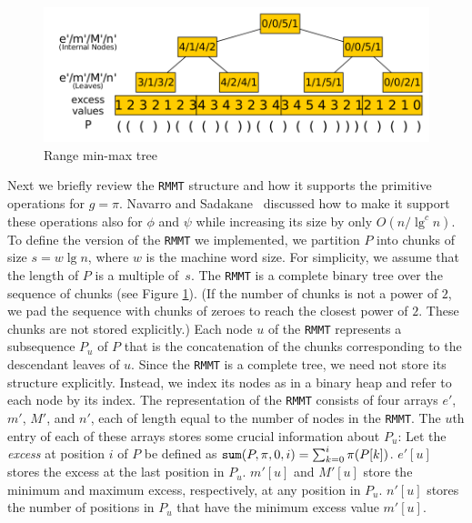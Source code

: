 \begin{figure}[t]
  \centerline{\includegraphics[scale=0.28]{./images/Range-min-max-tree.png}}
  \vspace{1ex}
  \caption{Range min-max tree}
  \label{fig:RangeMinMaxTree}
\end{figure}

Next we briefly review the {\tt RMMT} structure and how it supports
the primitive operations for $g = \pi$.  Navarro and
Sadakane~\cite{Navarro:2014:FFS:2620785.2601073} discussed how to make
it support these operations also for $\phi$ and $\psi$ while
increasing its size by only $O(n/\lg^c n)$.  To define the version of
the {\tt RMMT} we implemented, we partition $P$ into chunks
of size $s = w \lg n$, where $w$ is the machine word size.  For
simplicity, we assume that the length of $P$ is a multiple of~$s$.
The {\tt RMMT} is a complete binary tree over the sequence of
chunks (see Figure \ref{fig:RangeMinMaxTree}).
(If the number of chunks is not a power of $2$, we pad the sequence
with chunks of zeroes to reach the closest power of $2$.
These chunks are not stored explicitly.)
Each node $u$ of the {\tt RMMT} represents a subsequence $P_u$
of $P$ that is the concatenation of the chunks corresponding to the
descendant leaves of $u$.  Since the {\tt RMMT} is a complete tree, we
need not store its structure explicitly.  Instead, we index its
nodes as in a binary heap and refer to each node by its index.  The
representation of the {\tt RMMT} consists of four arrays $e'$, $m'$,
$M'$, and $n'$, each of length equal to the number of nodes in the
{\tt RMMT}.  The $u$th entry of each of these arrays stores some
crucial information about $P_u$: Let the {\em excess} at position $i$
of $P$ be defined as $\mathtt{sum}(P,\pi,0,i) = \sum_{k=0}^{i} \pi(P[k])$.
$e'[u]$ stores the excess at the last position in $P_u$.  $m'[u]$ and
$M'[u]$ store the minimum and maximum excess, respectively, at any position in
$P_u$.  $n'[u]$ stores the number of positions in $P_u$ that
have the minimum excess value $m'[u]$.

